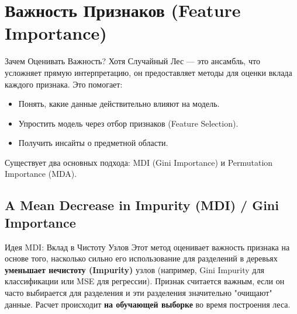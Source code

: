 \section{Важность Признаков (Feature Importance)}

\begin{textbox}{Зачем Оценивать Важность?}
    Хотя Случайный Лес — это ансамбль, что усложняет прямую интерпретацию, он предоставляет методы для оценки вклада каждого признака. Это помогает:
    \begin{itemize}[nosep, leftmargin=*]
        \item Понять, какие данные действительно влияют на модель.
        \item Упростить модель через отбор признаков (Feature Selection).
        \item Получить инсайты о предметной области.
    \end{itemize}
    Существует два основных подхода: MDI (Gini Importance) и Permutation Importance (MDA).
\end{textbox}

\subsection{A Mean Decrease in Impurity (MDI) / Gini Importance}

\begin{myblock}{Идея MDI: Вклад в Чистоту Узлов}
    Этот метод оценивает важность признака на основе того, насколько сильно его использование для разделений в деревьях \textbf{уменьшает нечистоту (Impurity)} узлов (например, Gini Impurity для классификации или MSE для регрессии). Признак считается важным, если он часто выбирается для разделения и эти разделения значительно "очищают" данные. Расчет происходит \textbf{на обучающей выборке} во время построения леса.
\end{myblock}

